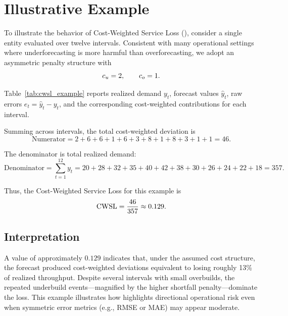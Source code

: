 \section{Illustrative Example}

To illustrate the behavior of Cost-Weighted Service Loss (\CWSL), consider a
single entity evaluated over twelve intervals. Consistent with many operational
settings where underforecasting is more harmful than overforecasting, we adopt
an asymmetric penalty structure with
\[
c_u = 2,
\qquad
c_o = 1.
\]

Table~\ref{tab:cwsl_example} reports realized demand \(y_t\), forecast values
\(\hat{y}_t\), raw errors \(e_t = \hat{y}_t - y_t\), and the corresponding
cost-weighted contributions for each interval.



Summing across intervals, the total cost-weighted deviation is
\[
\text{Numerator}
= 2 + 6 + 6 + 1 + 6 + 3 + 8 + 1 + 8 + 3 + 1 + 1
= 46.
\]

The denominator is total realized demand:
\[
\text{Denominator}
= \sum_{t=1}^{12} y_t
= 20 + 28 + 32 + 35 + 40 + 42 + 38 + 30 + 26 + 24 + 22 + 18
= 357.
\]

Thus, the Cost-Weighted Service Loss for this example is
\[
\text{CWSL}
= \frac{46}{357}
\approx 0.129.
\]

\subsection*{Interpretation}

A \CWSL{} value of approximately \(0.129\) indicates that, under the assumed cost
structure, the forecast produced cost-weighted deviations equivalent to losing
roughly 13\% of realized throughput. Despite several intervals with small
overbuilds, the repeated underbuild events—magnified by the higher shortfall
penalty—dominate the loss. This example illustrates how \CWSL{} highlights
directional operational risk even when symmetric error metrics (e.g., RMSE or
MAE) may appear moderate.
